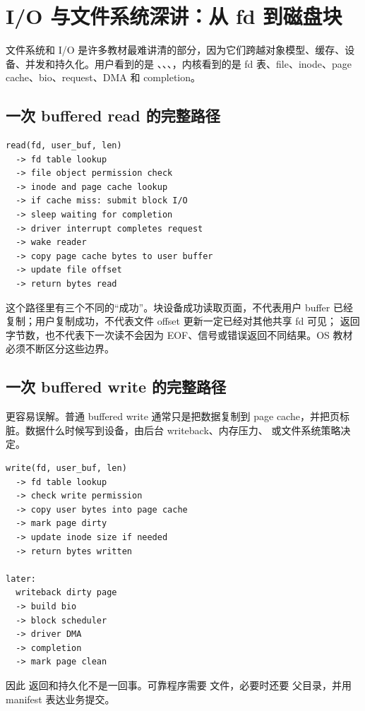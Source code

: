 \section{I/O 与文件系统深讲：从 fd 到磁盘块}

文件系统和 I/O 是许多教材最难讲清的部分，因为它们跨越对象模型、缓存、设备、并发和持久化。用户看到的是 、、、，内核看到的是 fd 表、file、inode、page cache、bio、request、DMA 和 completion。

\subsection{一次 buffered read 的完整路径}

\begin{lstlisting}
read(fd, user_buf, len)
  -> fd table lookup
  -> file object permission check
  -> inode and page cache lookup
  -> if cache miss: submit block I/O
  -> sleep waiting for completion
  -> driver interrupt completes request
  -> wake reader
  -> copy page cache bytes to user buffer
  -> update file offset
  -> return bytes read
\end{lstlisting}

这个路径里有三个不同的“成功”。块设备成功读取页面，不代表用户 buffer 已经复制；用户复制成功，不代表文件 offset 更新一定已经对其他共享 fd 可见； 返回字节数，也不代表下一次读不会因为 EOF、信号或错误返回不同结果。OS 教材必须不断区分这些边界。

\subsection{一次 buffered write 的完整路径}

 更容易误解。普通 buffered write 通常只是把数据复制到 page cache，并把页标脏。数据什么时候写到设备，由后台 writeback、内存压力、 或文件系统策略决定。

\begin{lstlisting}
write(fd, user_buf, len)
  -> fd table lookup
  -> check write permission
  -> copy user bytes into page cache
  -> mark page dirty
  -> update inode size if needed
  -> return bytes written

later:
  writeback dirty page
  -> build bio
  -> block scheduler
  -> driver DMA
  -> completion
  -> mark page clean
\end{lstlisting}

因此  返回和持久化不是一回事。可靠程序需要  文件，必要时还要  父目录，并用 manifest 表达业务提交。

